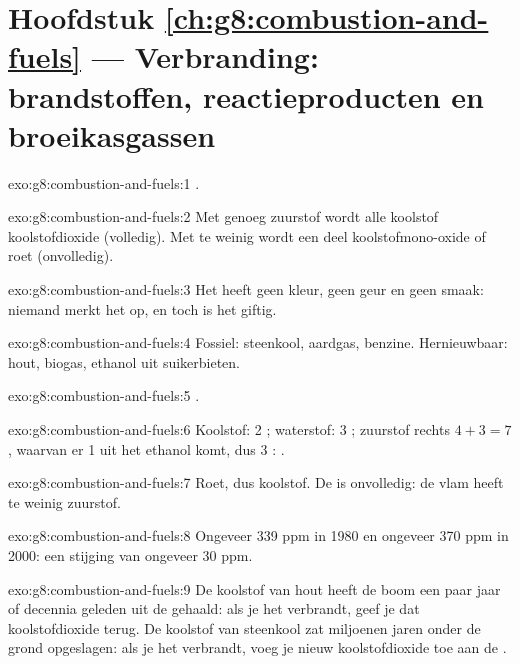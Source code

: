 \section*{Hoofdstuk \ref{ch:g8:combustion-and-fuels} --- Verbranding: brandstoffen, reactieproducten en broeikasgassen}

\begin{solution}{exo:g8:combustion-and-fuels:1}
.
\end{solution}

\begin{solution}{exo:g8:combustion-and-fuels:2}
Met genoeg zuurstof wordt alle koolstof koolstofdioxide (volledig). Met
te weinig wordt een deel koolstofmono-oxide of roet (onvolledig).
\end{solution}

\begin{solution}{exo:g8:combustion-and-fuels:3}
Het heeft geen kleur, geen geur en geen smaak: niemand merkt het op, en
toch is het giftig.
\end{solution}

\begin{solution}{exo:g8:combustion-and-fuels:4}
Fossiel: steenkool, aardgas, benzine. Hernieuwbaar: hout, biogas,
ethanol uit suikerbieten.
\end{solution}

\begin{solution}{exo:g8:combustion-and-fuels:5}
.
\end{solution}

\begin{solution}{exo:g8:combustion-and-fuels:6}
Koolstof: 2 ; waterstof: 3 ; zuurstof rechts $4 + 3 =
7$, waarvan er 1 uit het ethanol komt, dus 3 :
.
\end{solution}

\begin{solution}{exo:g8:combustion-and-fuels:7}
Roet, dus koolstof. De  is onvolledig: de vlam heeft te weinig
zuurstof.
\end{solution}

\begin{solution}{exo:g8:combustion-and-fuels:8}
Ongeveer 339 ppm in 1980 en ongeveer 370 ppm in 2000: een stijging van
ongeveer 30 ppm.
\end{solution}

\begin{solution}{exo:g8:combustion-and-fuels:9}
De koolstof van hout heeft de boom een paar jaar of decennia geleden uit
de  gehaald: als je het verbrandt, geef je dat koolstofdioxide
terug. De koolstof van steenkool zat miljoenen jaren onder de grond
opgeslagen: als je het verbrandt, voeg je nieuw koolstofdioxide toe aan
de .
\end{solution}

